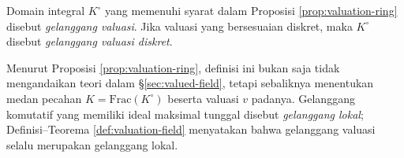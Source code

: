 \begin{definition}\label{def:valuation-ring}
	Domain integral $K^\circ$ yang memenuhi syarat dalam Proposisi \ref{prop:valuation-ring} disebut \emph{gelanggang valuasi}. Jika valuasi yang bersesuaian diskret, maka $K^\circ$ disebut \emph{gelanggang valuasi diskret}. 
\end{definition}
Menurut Proposisi \ref{prop:valuation-ring}, definisi ini bukan saja tidak mengandaikan teori dalam \S\ref{sec:valued-field}, tetapi sebaliknya menentukan medan pecahan $K = \text{Frac}(K^\circ)$ beserta valuasi $v$ padanya. Gelanggang komutatif yang memiliki ideal maksimal tunggal disebut \emph{gelanggang lokal}; Definisi--Teorema \ref{def:valuation-field} menyatakan bahwa gelanggang valuasi selalu merupakan gelanggang lokal. 

